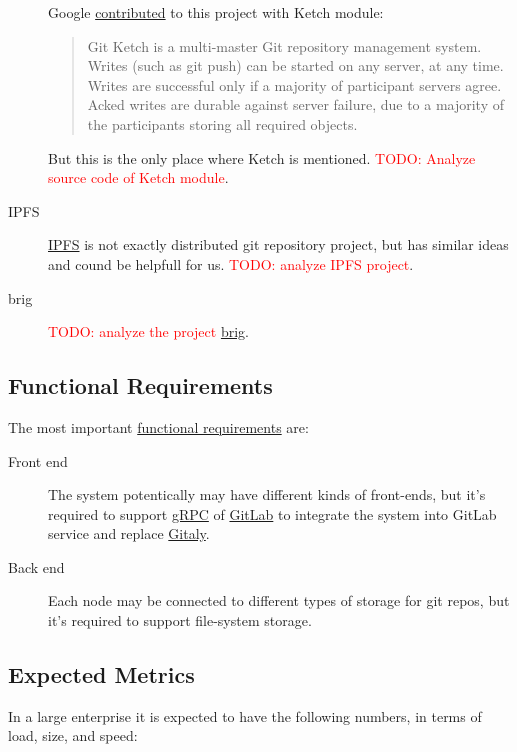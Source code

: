\documentclass[12pt,oneside]{article}
\newcommand{\todo}[1]{\textcolor{red}{TODO: #1}}
\begin{document}
\begin{description}
    Google \href{https://www.eclipse.org//lists/jgit-dev/msg03073.html}{contributed} to this project with Ketch module:
    \begin{quote}
      Git Ketch is a multi-master Git repository management system. Writes
      (such as git push) can be started on any server, at any time. Writes
      are successful only if a majority of participant servers agree.
      Acked writes are durable against server failure, due to a majority of
      the participants storing all required objects.
    \end{quote}
    But this is the only place where Ketch is mentioned. \todo{Analyze source code of Ketch module}.
  \item[IPFS]
    \href{https://ipfs.io/}{IPFS} is not exactly distributed git repository project, but has similar ideas
    and cound be helpfull for us. \todo{analyze IPFS project}.
  \item[brig]
    \todo{analyze the project} \href{https://github.com/sahib/brig}{brig}.
\end{description}

\subsection{Functional Requirements}
\label{sec:nfr}

The most important \href{https://en.wikipedia.org/wiki/Functional_requirement}{functional requirements} are:

\begin{description}
  \item[Front end]
    The system potentically may have different kinds of front-ends,
    but it's required to support \href{https://grpc.io/}{gRPC}
    of \href{https://about.gitlab.com/}{GitLab} to integrate the system
    into GitLab service and replace
    \href{https://docs.gitlab.com/ee/administration/gitaly/}{Gitaly}.
  \item[Back end]
    Each node may be connected to different types of storage for git repos,
    but it's required to support file-system storage.
\end{description}

\subsection{Expected Metrics}
\label{ref:metrics}

In a large enterprise it is expected to have the following
numbers, in terms of load, size, and speed:
\end{document}

